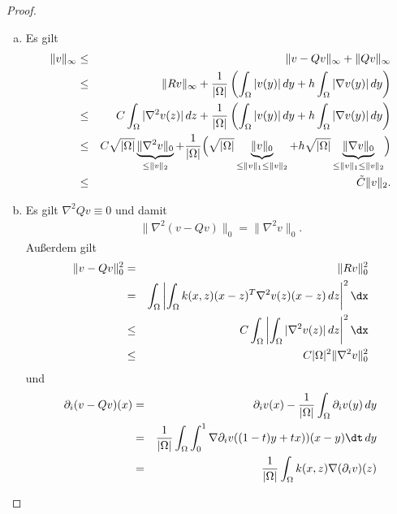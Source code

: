 \begin{proof}
    \begin{enumerate}[a)]
      \item
        Es gilt
        \begin{eqnarray*}
                  \|v\|_\infty
            &\le& \|v -Qv\|_\infty + \|Qv\|_\infty \\
            &\le& \|Rv\|_\infty + \frac{1}{|\Omega|} \left(\int_\Omega |v(y)|
                  \,dy + h \int_\Omega |\nabla v(y)| \,dy\right) \\
            &\le& C \int_\Omega |\nabla^2 v(z)| \,dz + \frac{1}{|\Omega|}
                  \left(\int_\Omega |v(y)| \,dy + h \int_\Omega |\nabla v(y)|
                  \,dy\right)\\
            &\le& C \sqrt{|\Omega|} \underbrace{\|\nabla^2 v\|_0}_{\le \|v\|_2}
                  + \frac{1}{|\Omega|}
                  \Bigl(\sqrt{|\Omega|} \underbrace{\|v\|_0}
                  _{\le \|v\|_1 \le \|v\|_2} + h \sqrt{|\Omega|}
                  \underbrace{\|\nabla v\|_0}_{\le\|v\|_1 \le \|v\|_2} \Bigr) \\
            &\le& \tilde C \| v\|_2.
        \end{eqnarray*}
      \item
        Es gilt $\nabla^2 Qv \equiv 0$ und damit
        \begin{eqnarray*}
            \|\nabla^2 (v - Qv)\|_0 = \|\nabla^2 v\|_0.
        \end{eqnarray*}
        Au\ss{}erdem gilt
        \begin{eqnarray*}
                \|v -Qv\|_0^2
            &=& \|Rv\|_0^2 \\
            &=& \int_\Omega \left|\int_\Omega k(x, z) (x - z)^T \nabla^2 v(z)
                (x - z) \,dz \right|^2 \dx \\
            &\le& C \int_\Omega \left|\int_\Omega |\nabla^2 v(z)| \,dz \right|^2
                    \dx \\
            &\le& C |\Omega|^2 \|\nabla^2 v\|_0^2
        \end{eqnarray*}
        und
        \begin{eqnarray*}
                \partial_i (v - Qv)(x)
            &=& \partial_i v(x) - \frac{1}{|\Omega|} \int_\Omega \partial_i v(y)
                \,dy \\
            &=& \frac{1}{|\Omega|} \int_\Omega \int_0^1 \nabla \partial_i
                v((1 - t) y + tx)) (x - y) \dt \,dy \\
            &=& \frac{1}{|\Omega|} \int_\Omega k(x, z) \nabla (\partial_i v)(z)

\end{eqnarray*}
\end{enumerate}
\end{proof}
